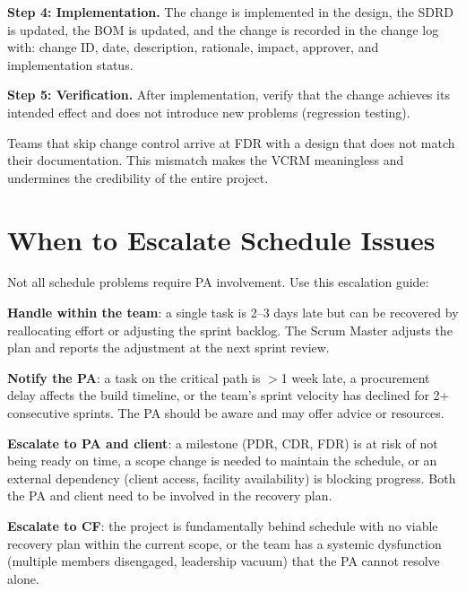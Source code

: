 \textbf{Step 4: Implementation.} The change is implemented in the design, the SDRD is updated, the BOM is updated, and the change is recorded in the change log with: change ID, date, description, rationale, impact, approver, and implementation status.

\textbf{Step 5: Verification.} After implementation, verify that the change achieves its intended effect and does not introduce new problems (regression testing).

Teams that skip change control arrive at FDR with a design that does not match their documentation. This mismatch makes the VCRM meaningless and undermines the credibility of the entire project.

\section{When to Escalate Schedule Issues}
Not all schedule problems require PA involvement. Use this escalation guide:

\textbf{Handle within the team}: a single task is 2--3 days late but can be recovered by reallocating effort or adjusting the sprint backlog. The Scrum Master adjusts the plan and reports the adjustment at the next sprint review.

\textbf{Notify the PA}: a task on the critical path is $>$1 week late, a procurement delay affects the build timeline, or the team's sprint velocity has declined for 2+ consecutive sprints. The PA should be aware and may offer advice or resources.

\textbf{Escalate to PA and client}: a milestone (PDR, CDR, FDR) is at risk of not being ready on time, a scope change is needed to maintain the schedule, or an external dependency (client access, facility availability) is blocking progress. Both the PA and client need to be involved in the recovery plan.

\textbf{Escalate to CF}: the project is fundamentally behind schedule with no viable recovery plan within the current scope, or the team has a systemic dysfunction (multiple members disengaged, leadership vacuum) that the PA cannot resolve alone.



